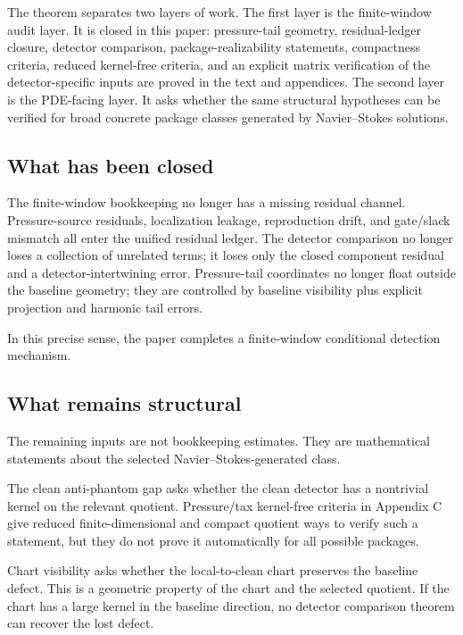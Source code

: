 \documentclass[11pt]{article}
\numberwithin{equation}{section}
\theoremstyle{definition}
\theoremstyle{remark}
\begin{document}
The theorem separates two layers of work.  The first layer is the finite-window audit layer.  It is closed in this paper: pressure-tail geometry, residual-ledger closure, detector comparison, package-realizability statements, compactness criteria, reduced kernel-free criteria, and an explicit matrix verification of the detector-specific inputs are proved in the text and appendices.  The second layer is the PDE-facing layer.  It asks whether the same structural hypotheses can be verified for broad concrete package classes generated by Navier--Stokes solutions.

\subsection*{What has been closed}

The finite-window bookkeeping no longer has a missing residual channel.  Pressure-source residuals, localization leakage, reproduction drift, and gate/slack mismatch all enter the unified residual ledger.  The detector comparison no longer loses a collection of unrelated terms; it loses only the closed component residual and a detector-intertwining error.  Pressure-tail coordinates no longer float outside the baseline geometry; they are controlled by baseline visibility plus explicit projection and harmonic tail errors.

In this precise sense, the paper completes a finite-window conditional detection mechanism.

\subsection*{What remains structural}

The remaining inputs are not bookkeeping estimates.  They are mathematical statements about the selected Navier--Stokes-generated class.

The clean anti-phantom gap asks whether the clean detector has a nontrivial kernel on the relevant quotient.  Pressure/tax kernel-free criteria in Appendix C give reduced finite-dimensional and compact quotient ways to verify such a statement, but they do not prove it automatically for all possible packages.

Chart visibility asks whether the local-to-clean chart preserves the baseline defect.  This is a geometric property of the chart and the selected quotient.  If the chart has a large kernel in the baseline direction, no detector comparison theorem can recover the lost defect.
\end{document}

